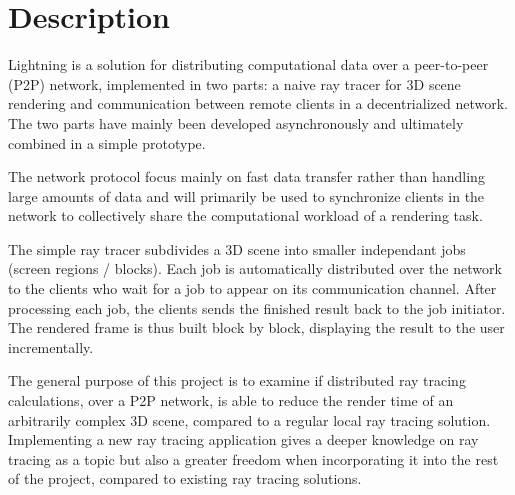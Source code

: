 \chapter{Description}


Lightning is a solution for distributing computational data over a peer-to-peer (P2P) network, implemented in two parts: a naive ray tracer for 3D scene rendering and communication between remote clients in a decentrialized network. The two parts have mainly been developed asynchronously and ultimately combined in a simple prototype. 

The network protocol focus mainly on fast data transfer rather than handling
large amounts of data and will primarily be used to synchronize clients in the
network to collectively share the computational workload of a rendering task.

The simple ray tracer subdivides a 3D scene into smaller independant jobs
(screen regions / blocks). Each job is automatically distributed over the
network to the clients who wait for a job to appear on its communication
channel. After processing each job, the clients sends the finished result back
to the job initiator. The rendered frame is thus built block by block,
displaying the result to the user incrementally. 

The general purpose of this project is to examine if distributed ray tracing calculations, over a P2P network, is able to reduce the render time of an arbitrarily complex 3D scene, compared to a regular local ray tracing solution. Implementing a new ray tracing application gives a deeper knowledge on ray tracing as a topic but also a greater freedom when incorporating it into the rest of the project, compared to existing ray tracing solutions.

